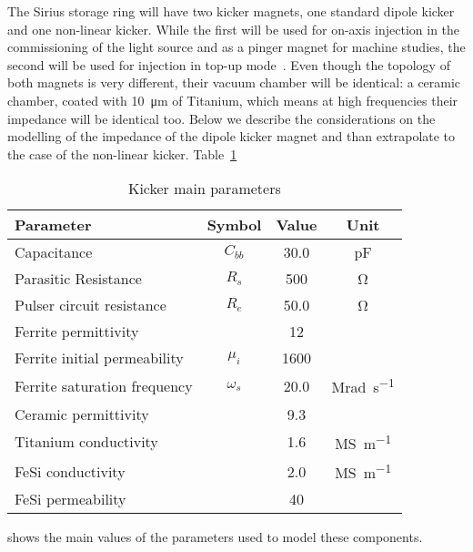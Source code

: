     The Sirius storage ring will have two kicker magnets, one standard dipole kicker and one non-linear kicker. While the first will be used for on-axis injection in the commissioning of the light source and as a pinger magnet for machine studies, the second will be used for injection in top-up mode~\cite{Liu2016a}. Even though the topology of both magnets is very different, their vacuum chamber will be identical: a ceramic chamber, coated with \SI{10}{\micro\meter} of Titanium, which means at high frequencies their impedance will be identical too. Below we describe the considerations on the modelling of the impedance of the dipole kicker magnet and than extrapolate to the case of the non-linear kicker. Table~\ref{tab:kicker_paramters}
    \begin{table}[t]
        \centering
        \caption{Kicker main parameters}
        \label{tab:kicker_paramters}
        \begin{tabular}{lccc}
            \toprule
            Parameter                     & Symbol    & Value  & Unit \\
            \midrule
            Capacitance                   & $C_{bb}$  &  30.0  & \si{\pico\farad}\\
            Parasitic Resistance          & $R_s$     &  500   & \si{\ohm}\\
            Pulser circuit resistance     & $R_e$     &  50.0  & \si{\ohm}\\
            Ferrite permittivity          &           &   12   & \\
            Ferrite initial permeability  & $\mu_i$   &  1600  & \\
            Ferrite saturation frequency  & $\omega_s$&  20.0  & \si{\mega\radian\per\second}\\
            Ceramic permittivity          &           &  9.3   & \\
            Titanium conductivity         &           &  1.6   & \si{\mega\siemens\per\meter}\\
            FeSi conductivity             &           &  2.0   & \si{\mega\siemens\per\meter}\\
            FeSi permeability             &           & 40     & \\
            \bottomrule
        \end{tabular}
    \end{table}
    shows the main values of the parameters used to model these components.

